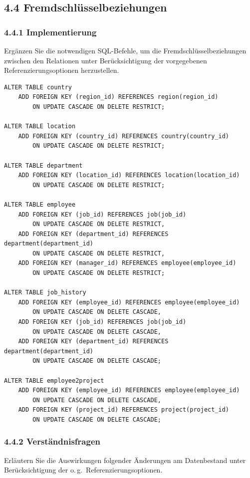 \documentclass[11pt,a4paper]{article}
\begin{document}
\subsection*{4.4 \quad Fremdschl\"usselbeziehungen}
\subsubsection*{4.4.1 \quad Implementierung}
Erg\"anzen Sie die notwendigen SQL-Befehle, um die Fremdschl\"usselbeziehungen zwischen den Relationen unter Ber\"ucksichtigung der vorgegebenen Referenzierungsoptionen herzustellen.

\begin{loesung}
\begin{lstlisting}
ALTER TABLE country
    ADD FOREIGN KEY (region_id) REFERENCES region(region_id)
        ON UPDATE CASCADE ON DELETE RESTRICT;

ALTER TABLE location
    ADD FOREIGN KEY (country_id) REFERENCES country(country_id)
        ON UPDATE CASCADE ON DELETE RESTRICT;

ALTER TABLE department
    ADD FOREIGN KEY (location_id) REFERENCES location(location_id)
        ON UPDATE CASCADE ON DELETE RESTRICT;

ALTER TABLE employee
    ADD FOREIGN KEY (job_id) REFERENCES job(job_id)
        ON UPDATE CASCADE ON DELETE RESTRICT,
    ADD FOREIGN KEY (department_id) REFERENCES department(department_id)
        ON UPDATE CASCADE ON DELETE RESTRICT,
    ADD FOREIGN KEY (manager_id) REFERENCES employee(employee_id)
        ON UPDATE CASCADE ON DELETE RESTRICT;

ALTER TABLE job_history
    ADD FOREIGN KEY (employee_id) REFERENCES employee(employee_id)
        ON UPDATE CASCADE ON DELETE CASCADE,
    ADD FOREIGN KEY (job_id) REFERENCES job(job_id)
        ON UPDATE CASCADE ON DELETE CASCADE,
    ADD FOREIGN KEY (department_id) REFERENCES department(department_id)
        ON UPDATE CASCADE ON DELETE CASCADE;

ALTER TABLE employee2project
    ADD FOREIGN KEY (employee_id) REFERENCES employee(employee_id)
        ON UPDATE CASCADE ON DELETE CASCADE,
    ADD FOREIGN KEY (project_id) REFERENCES project(project_id)
        ON UPDATE CASCADE ON DELETE CASCADE;
\end{lstlisting}
\end{loesung}

\subsubsection*{4.4.2 \quad Verst\"andnisfragen}
Erl\"autern Sie die Auswirkungen folgender \"Anderungen am Datenbestand unter Ber\"ucksichtigung der o.\,g.\ Referenzierungsoptionen.
\end{document}

